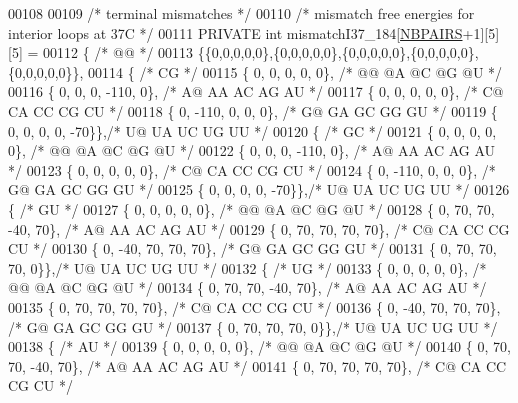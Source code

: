 \begin{DoxyCode}
00108 
00109 \textcolor{comment}{/* terminal mismatches */}
00110 \textcolor{comment}{/* mismatch free energies for interior loops at 37C */}
00111 PRIVATE \textcolor{keywordtype}{int} mismatchI37\_184[\hyperlink{energy__const_8h_a5e75221c779d618eab81e096f37e32ce}{NBPAIRS}+1][5][5] =
00112 \{ \textcolor{comment}{/* @@ */}
00113   \{\{0,0,0,0,0\},\{0,0,0,0,0\},\{0,0,0,0,0\},\{0,0,0,0,0\},\{0,0,0,0,0\}\},
00114   \{ \textcolor{comment}{/* CG */}
00115    \{   0,    0,    0,    0,    0\}, \textcolor{comment}{/* @@  @A  @C  @G  @U */}
00116    \{   0,    0,    0, -110,    0\}, \textcolor{comment}{/* A@  AA  AC  AG  AU */}
00117    \{   0,    0,    0,    0,    0\}, \textcolor{comment}{/* C@  CA  CC  CG  CU */}
00118    \{   0, -110,    0,    0,    0\}, \textcolor{comment}{/* G@  GA  GC  GG  GU */}
00119    \{   0,    0,    0,    0,  -70\}\},\textcolor{comment}{/* U@  UA  UC  UG  UU */}
00120   \{ \textcolor{comment}{/* GC */}
00121    \{   0,    0,    0,    0,    0\}, \textcolor{comment}{/* @@  @A  @C  @G  @U */}
00122    \{   0,    0,    0, -110,    0\}, \textcolor{comment}{/* A@  AA  AC  AG  AU */}
00123    \{   0,    0,    0,    0,    0\}, \textcolor{comment}{/* C@  CA  CC  CG  CU */}
00124    \{   0, -110,    0,    0,    0\}, \textcolor{comment}{/* G@  GA  GC  GG  GU */}
00125    \{   0,    0,    0,    0,  -70\}\},\textcolor{comment}{/* U@  UA  UC  UG  UU */}
00126   \{ \textcolor{comment}{/* GU */}
00127    \{   0,    0,    0,    0,    0\}, \textcolor{comment}{/* @@  @A  @C  @G  @U */}
00128    \{   0,   70,   70,  -40,   70\}, \textcolor{comment}{/* A@  AA  AC  AG  AU */}
00129    \{   0,   70,   70,   70,   70\}, \textcolor{comment}{/* C@  CA  CC  CG  CU */}
00130    \{   0,  -40,   70,   70,   70\}, \textcolor{comment}{/* G@  GA  GC  GG  GU */}
00131    \{   0,   70,   70,   70,    0\}\},\textcolor{comment}{/* U@  UA  UC  UG  UU */}
00132   \{ \textcolor{comment}{/* UG */}
00133    \{   0,    0,    0,    0,    0\}, \textcolor{comment}{/* @@  @A  @C  @G  @U */}
00134    \{   0,   70,   70,  -40,   70\}, \textcolor{comment}{/* A@  AA  AC  AG  AU */}
00135    \{   0,   70,   70,   70,   70\}, \textcolor{comment}{/* C@  CA  CC  CG  CU */}
00136    \{   0,  -40,   70,   70,   70\}, \textcolor{comment}{/* G@  GA  GC  GG  GU */}
00137    \{   0,   70,   70,   70,    0\}\},\textcolor{comment}{/* U@  UA  UC  UG  UU */}
00138   \{ \textcolor{comment}{/* AU */}
00139    \{   0,    0,    0,    0,    0\}, \textcolor{comment}{/* @@  @A  @C  @G  @U */}
00140    \{   0,   70,   70,  -40,   70\}, \textcolor{comment}{/* A@  AA  AC  AG  AU */}
00141    \{   0,   70,   70,   70,   70\}, \textcolor{comment}{/* C@  CA  CC  CG  CU */}

\end{DoxyCode}
